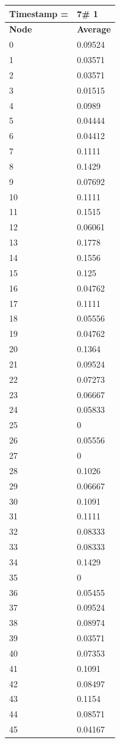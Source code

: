 \begin{tabular}{|l||l|}
\hline
\textbf{Timestamp =} & \textbf{7}\# 1\\\hline
	\textbf{Node} & \textbf{Average} \\ \hline
\hline
	0 & 0.09524 \\ \hline
	1 & 0.03571 \\ \hline
	2 & 0.03571 \\ \hline
	3 & 0.01515 \\ \hline
	4 & 0.0989 \\ \hline
	5 & 0.04444 \\ \hline
	6 & 0.04412 \\ \hline
	7 & 0.1111 \\ \hline
	8 & 0.1429 \\ \hline
	9 & 0.07692 \\ \hline
	10 & 0.1111 \\ \hline
	11 & 0.1515 \\ \hline
	12 & 0.06061 \\ \hline
	13 & 0.1778 \\ \hline
	14 & 0.1556 \\ \hline
	15 & 0.125 \\ \hline
	16 & 0.04762 \\ \hline
	17 & 0.1111 \\ \hline
	18 & 0.05556 \\ \hline
	19 & 0.04762 \\ \hline
	20 & 0.1364 \\ \hline
	21 & 0.09524 \\ \hline
	22 & 0.07273 \\ \hline
	23 & 0.06667 \\ \hline
	24 & 0.05833 \\ \hline
	25 & 0 \\ \hline
	26 & 0.05556 \\ \hline
	27 & 0 \\ \hline
	28 & 0.1026 \\ \hline
	29 & 0.06667 \\ \hline
	30 & 0.1091 \\ \hline
	31 & 0.1111 \\ \hline
	32 & 0.08333 \\ \hline
	33 & 0.08333 \\ \hline
	34 & 0.1429 \\ \hline
	35 & 0 \\ \hline
	36 & 0.05455 \\ \hline
	37 & 0.09524 \\ \hline
	38 & 0.08974 \\ \hline
	39 & 0.03571 \\ \hline
	40 & 0.07353 \\ \hline
	41 & 0.1091 \\ \hline
	42 & 0.08497 \\ \hline
	43 & 0.1154 \\ \hline
	44 & 0.08571 \\ \hline
	45 & 0.04167 \\ \hline
\end{tabular}
